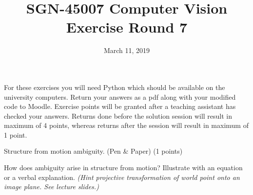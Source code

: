 \documentclass[12pt]{article} %
\title{SGN-45007 Computer Vision\\ Exercise Round 7}
\date{\vspace{-5mm} March 11, 2019}
\date{} %
\newenvironment{exercise}[2][Task]{\begin{trivlist}
\item[\hskip \labelsep {\bfseries #1}\hskip \labelsep {\bfseries #2.}]}{\end{trivlist}}
\begin{document}
\maketitle


\noindent For these exercises you will need Python which should be available on the university computers. Return your answers as a pdf along with your modified code to Moodle. Exercise points will be granted after a teaching assistant has checked your answers. Returns done before the solution session will result in maximum of 4 points, whereas returns after the session will result in maximum of 1 point. 
\newline


\begin{exercise}{1} Structure from motion ambiguity. (Pen \& Paper) (1 points)


  How does ambiguity arise in structure from motion?
  Illustrate with an equation or a verbal explanation.
  \textit{(Hint projective transformation of world point onto an image plane. See lecture slides.)}

\end{exercise}
\end{document}
